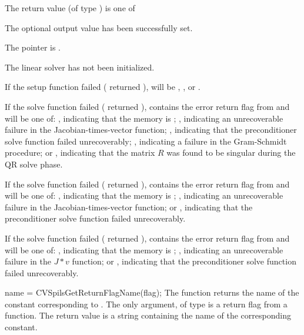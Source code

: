 {
  The return value  (of type ) is one of
  \begin{args}
  \item[\Id{CVSPILS\_SUCCESS}] 
    The optional output value has been successfully set.
  \item[\Id{CVSPILS\_MEM\_NULL}]
    The  pointer is .
  \item[\Id{CVSPILS\_LMEM\_NULL}]
    The {\cvspils} linear solver has not been initialized.
  \end{args}
}
{
  If the {\cvspils} setup function failed ( returned
  ),  will be ,
  , or .

  If the {\cvspgmr} solve function failed ( returned
  ),  contains the error return flag from
   and will be one of:
  , indicating that the {\spgmr} memory is ;
  , indicating an unrecoverable failure in the 
  Jacobian-times-vector function;
  , indicating that the preconditioner solve
  function  failed unrecoverably;
  , indicating a failure in the Gram-Schmidt procedure; 
  or , indicating that the matrix $R$ was found to be
  singular during the QR solve phase.

  If the {\cvspbcg} solve function failed ( returned
  ),  contains the error return flag from
   and will be one of:
  , indicating that the {\spbcg} memory is ;
  , indicating an unrecoverable failure in the 
  Jacobian-times-vector function; or
  , indicating that the preconditioner solve
  function  failed unrecoverably.

  If the {\cvsptfqmr} solve function failed ( returned
  ),  contains the error return flag from
   and will be one of:
  , indicating that the {\sptfqmr} memory is ;
  , indicating an unrecoverable failure in the 
  $J*v$ function; or
  , indicating that the preconditioner solve
  function  failed unrecoverably.
}
{
  name = CVSpilsGetReturnFlagName(flag);
}
{
  The function  returns the
  name of the {\cvspils} constant corresponding to .
}
{
  The only argument, of type  is a return flag from a {\cvspils} function.
}
{
  The return value is a string containing the name of the corresponding constant.
}
{}


